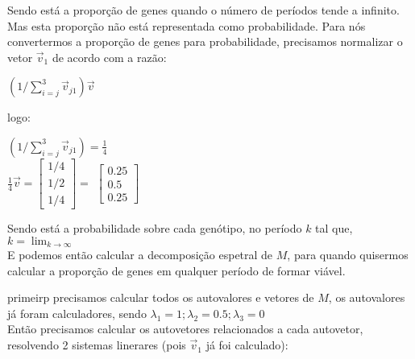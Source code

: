 \documentclass[14pt]{article}
\begin{document}
Sendo está a proporção de genes quando o número de períodos tende a infinito.
Mas esta proporção não está representada como probabilidade. Para nós convertermos a proporção de genes para probabilidade, precisamos normalizar o vetor $\vec{v}_1$ de acordo com a razão:\\

\begin{center}
    $\left( 1 / \sum_{i=j}^{3} \vec{v}_{j1} \right)\vec{v}$    
\end{center}

$ $\\

logo:
\begin{center}
    $\left( 1 / \sum_{i=j}^{3} \vec{v}_{j1} \right) = \frac{1}{4}$\\
    $ $\\
    $ $\\
    $\frac{1}{4} \vec{v} =  \begin{bmatrix} 1/4\\ 1/2\\ 1/4 \end{bmatrix} = $
    $\begin{bmatrix} 0.25\\ 0.5\\ 0.25 \end{bmatrix}$
\end{center}

Sendo está a probabilidade sobre cada genótipo, no período $k$ tal que,  $k = \lim_{k\to\infty}$\\

E podemos então calcular a decomposição espetral de $M$, para quando quisermos calcular a proporção de genes em qualquer período de formar viável.

primeirp precisamos calcular todos os autovalores e vetores de $M$, os autovalores já foram calculadores, sendo $\lambda_1 = 1; \lambda_2 = 0.5; \lambda_3 = 0$\\

Então precisamos calcular os autovetores relacionados a cada autovetor, resolvendo 2 sistemas linerares (pois $\vec{v}_1$ já foi calculado):\\
\end{document}
